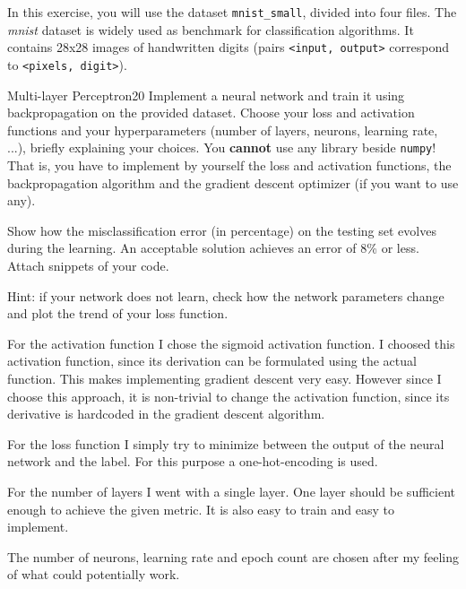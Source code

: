 \newif\ifvimbug
\vimbugfalse

\ifvimbug

\fi

In this exercise, you will use the dataset \texttt{mnist\_small}, divided into four files. The \textit{mnist} dataset is widely used as benchmark for classification algorithms. It contains 28x28 images of handwritten digits (pairs \texttt{<input, output>} correspond to \texttt{<pixels, digit>}).

\begin{questions}


\begin{question}{Multi-layer Perceptron}{20}
Implement a neural network and train it using backpropagation on the provided dataset. Choose your loss and activation functions and your hyperparameters (number of layers, neurons, learning rate, ...), briefly explaining your choices. You \textbf{cannot} use any library beside \texttt{numpy}! That is, you have to implement by yourself the loss and activation functions, the backpropagation algorithm and the gradient descent optimizer (if you want to use any).

Show how the misclassification error (in percentage) on the testing set evolves during the learning. An acceptable solution achieves an error of 8\% or less. Attach snippets of your code. 

Hint: if your network does not learn, check how the network parameters change and plot the trend of your loss function.

\begin{answer}
For the activation function I chose the sigmoid activation function. I choosed this activation function, since its derivation can be formulated using the actual function. This makes implementing gradient descent very easy. However since I choose this approach, it is non-trivial to change the activation function, since its derivative is hardcoded in the gradient descent algorithm. 

For the loss function I simply try to minimize between the output of the neural network and the label. For this purpose a one-hot-encoding is used. 

For the number of layers I went with a single layer. One layer should be sufficient enough to achieve the given metric. It is also easy to train and easy to implement. 

The number of neurons, learning rate and epoch count are chosen after my feeling of what could potentially work. 


\end{answer}
\end{question}
\end{questions}
